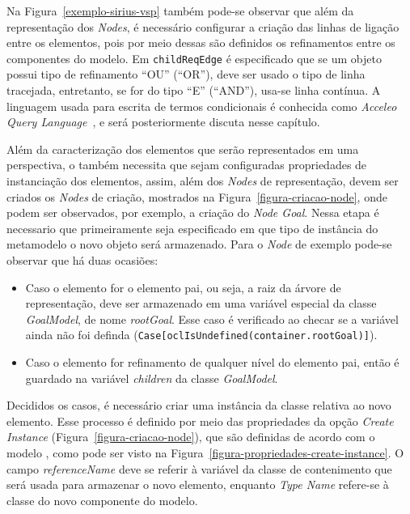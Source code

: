 Na Figura~\ref{exemplo-sirius-vsp} também pode-se observar que além da representação dos \textit{Nodes}, é necessário configurar a criação das linhas de ligação entre os elementos, pois por meio dessas são definidos os refinamentos entre os componentes do modelo. Em \texttt{childReqEdge} é especificado que se um objeto possui tipo de refinamento ``OU'' (``OR''), deve ser usado o tipo de linha tracejada, entretanto, se for do tipo ``E'' (``AND''), usa-se linha contínua. A linguagem usada para escrita de termos condicionais é conhecida como \textit{Acceleo Query Language}~\cite{musset2006acceleo}, e será posteriormente discuta nesse capítulo.

Além da caracterização dos elementos que serão representados em uma perspectiva, o \sirius também necessita que sejam configuradas propriedades de instanciação dos elementos, assim, além dos \textit{Nodes} de representação, devem ser criados os \textit{Nodes} de criação, mostrados na Figura~\ref{figura-criacao-node}, onde podem ser observados, por exemplo, a criação do \textit{Node Goal}. Nessa etapa é necessario que primeiramente seja especificado em que tipo de instância do metamodelo o novo objeto será armazenado. Para o \textit{Node} de exemplo pode-se observar que há duas ocasiões:
\begin{itemize}
	\item Caso o elemento for o elemento pai, ou seja, a raiz da árvore de representação, deve ser armazenado em uma variável especial da classe \textit{GoalModel}, de nome \textit{rootGoal}. Esse caso é verificado ao checar se a variável ainda não foi definda (\texttt{Case[oclIsUndefined(container.rootGoal)]}).
	\item Caso o elemento for refinamento de qualquer nível do elemento pai, então é guardado na variável \textit{children} da classe \textit{GoalModel}.
\end{itemize}

Decididos os casos, é necessário criar uma instância da classe relativa ao novo elemento. Esse processo é definido por meio das propriedades da opção \textit{Create Instance} (Figura~\ref{figura-criacao-node}), que são definidas de acordo com o modelo \ecore, como pode ser visto na Figura~\ref{figura-propriedades-create-instance}. O campo \textit{referenceName} deve se referir à variável da classe de contenimento que será usada para armazenar o novo elemento, enquanto \textit{Type Name} refere-se à classe do novo componente do modelo.

